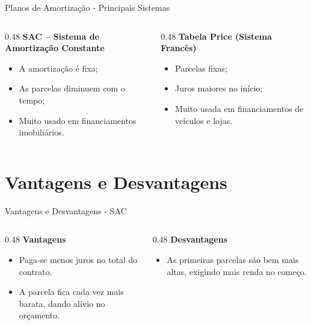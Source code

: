 \documentclass[12pt]{beamer}
\begin{document}
		\begin{frame}{Planos de Amortização - Principais Sistemas}
			
			\begin{columns}[T]
				
				\begin{column}{0.48\textwidth}
					\textbf{SAC – Sistema de Amortização Constante}
					\begin{itemize}
						\item A amortização é fixa;
						\item As parcelas diminuem com o tempo;
						\item Muito usado em financiamentos imobiliários.
					\end{itemize}
				\end{column}
				
				\begin{column}{0.48\textwidth}
					\textbf{Tabela Price (Sistema Francês)}
					\begin{itemize}
						\item Parcelas fixas;
						\item Juros maiores no início;
						\item Muito usada em financiamentos de veículos e lojas.
					\end{itemize}
				\end{column}
				
			\end{columns}
			
		\end{frame}
		
	\section{Vantagens e Desvantagens}
	
		\begin{frame}{Vantagens e Desvantagens - SAC}
			
			\begin{columns}[T]
				
				\begin{column}{0.48\textwidth}
					\textbf{Vantagens}
					\begin{itemize}
						\item Paga-se menos juros no total do contrato.
						\item A parcela fica cada vez mais barata, dando alívio no orçamento.
					\end{itemize}
				\end{column}
				
				\begin{column}{0.48\textwidth}
					\textbf{Desvantagens}
					\begin{itemize}
						\item As primeiras parcelas são bem mais altas, exigindo mais renda no começo.
					\end{itemize}
				\end{column}
				
			\end{columns}
			
		\end{frame}
		
\end{document}
